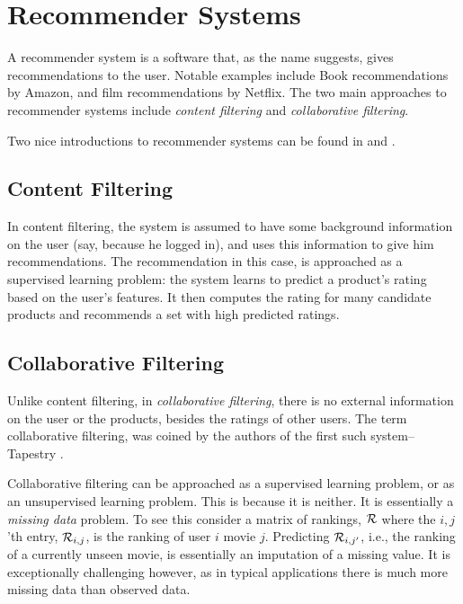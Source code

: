 \chapter{Recommender Systems}
\label{sec:recomender_systems}



A recommender system is a software that, as the name suggests, gives recommendations to the user. 
Notable examples include Book recommendations by Amazon, and film recommendations by Netflix.
The two main approaches to recommender systems include \emph{content filtering} and \emph{collaborative filtering}.

Two nice introductions to recommender systems can be found in \citet{koren_matrix_2009} and \citet{su_survey_2009}.


\section{Content Filtering}
\label{sec:content_filtering}

In content filtering, the system is assumed to have some background information on the user (say, because he logged in), and uses
this information to give him recommendations.
The recommendation in this case, is approached as a supervised learning problem: 
the system learns to predict a product's rating based on the user's features.
It then computes the rating for many candidate products and recommends a set with high predicted ratings.



\section{Collaborative Filtering}
\label{sec:collaborative_filtering}

Unlike content filtering, in \emph{collaborative filtering}, there is no external information on the user or the products, besides the ratings of other users. 
The term collaborative filtering, was coined by the authors of the first such system-- Tapestry \citep{goldberg_using_1992}. 

Collaborative filtering can be approached as a supervised learning problem, or as an unsupervised learning problem. This is because it is neither. 
It is essentially a \emph{missing data} problem.
To see this consider a matrix of rankings, $\mathcal{R}$ where the $i,j$'th entry, $\mathcal{R}_{i,j}$, is the ranking of user $i$ movie $j$. 
Predicting $\mathcal{R}_{i,j'}$, i.e., the ranking of a currently unseen movie, is essentially an imputation of a missing value.
It is exceptionally challenging however, as in typical applications there is much more missing data than observed data.


